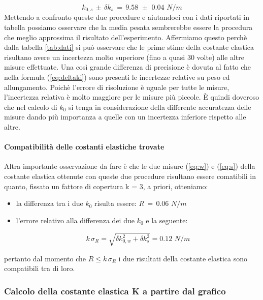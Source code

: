 \begin{equation}
    k_{0,s} \, \pm \, \delta k_{s} \,=\, 9.58 \,\, \pm \,\, 0.04 \,\, N/m
    \label{eq:s}
\end{equation}
%
Mettendo a confronto queste due procedure e aiutandoci con i dati riportati in tabella possiamo osservare che la media pesata sembrerebbe essere la procedura che meglio approssima il risultato dell'esperimento. Affermiamo questo perchè dalla tabella \ref{tab:dati} si può osservare che le prime stime della costante elastica risultano avere un incertezza molto superiore (fino a quasi 30 volte) alle altre misure effettuate. Una così grande differenza di precisione è dovuta al fatto che nella formula (\ref{eq:deltaki}) sono presenti le incertezze relative su peso ed allungamento. Poichè l'errore di risoluzione è uguale per tutte le misure, l'incertezza relativa è molto maggiore per le misure più piccole.  È quindi doveroso che nel calcolo di $k_0$ si tenga in considerazione della differente accuratezza delle misure dando più importanza a quelle con un incertezza inferiore rispetto alle altre.

\paragraph{Compatibilità delle costanti elastiche trovate\\}

Altra importante osservazione da fare è che le due misure (\ref{eq:w}) e (\ref{eq:s}) della costante elastica ottenute con queste due procedure risultano essere comatibili in quanto, fissato un fattore di copertura k = 3, a priori, otteniamo:
\begin{itemize}
	\item{la differenza tra i due $k_0$ risulta essere: $R \,=\, 0.06 \,\, N/m$}
	\item{l'errore relativo alla differenza dei due $k_0$ e la seguente:
            
        $$k \, \sigma_R = \sqrt{\delta k_{0,w}^2 + \delta k_{s}^2} = 0.12 \,\, N/m$$}
\end{itemize}
pertanto dal momento che $ R \leq k \, \sigma_R$ i due risultati della costante elastica sono compatibili tra di loro.

\subsubsection{Calcolo della costante elastica K a partire dal grafico}

